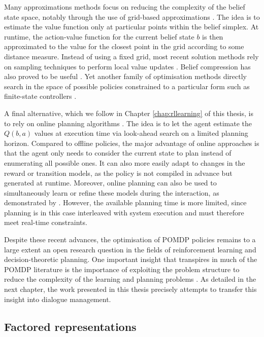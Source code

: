 Many approximations methods focus on reducing the complexity of the belief state space, notably through the use of grid-based approximations \citep{Zhou:2001}.  The idea is to estimate the value function only at particular points within the belief simplex. At runtime, the action-value function for the current belief state $b$ is then approximated to the value for the closest point in the grid according to some distance measure. Instead of using a fixed grid, most recent solution methods rely on sampling techniques to perform local value updates \citep{Pineau_2003,KurHsu08,shani2013}. Belief compression has also proved to be useful \citep{Roy:2005}.  Yet another family of optimisation methods directly search in the space of possible policies constrained to a particular form such as finite-state controllers \citep{Hansen98}. 

A final alternative, which we follow in Chapter \ref{chap:rllearning} of this thesis, is to rely on online planning algorithms \citep{ross2008,NIPS2010_0740}.  The idea is to let the agent estimate the $Q(b,a)$ values at execution time via look-ahead search on a limited planning horizon. Compared to offline policies, the major advantage of online approaches is that the agent only needs to consider the current state to plan instead of enumerating all possible ones. It can also more easily adapt to changes in the reward or transition models, as the policy is not compiled in advance but generated at runtime. Moreover, online planning can also be used to simultaneously learn or refine these models during the interaction, as demonstrated by \cite{Ross:2011}.  However, the available planning time is more limited, since planning is in this case interleaved with system execution and must therefore meet real-time constraints. %

Despite these recent advances, the optimisation of POMDP policies remains to a large extent an open research question in the fields of reinforcement learning and decision-theoretic planning. One important insight that transpires in much of the POMDP literature is the importance of exploiting the problem structure to reduce the complexity of the learning and planning problems \citep{Pineau:2004,poupart2005}.  As detailed in the next chapter, the work presented in this thesis precisely attempts to transfer this insight into dialogue management. 

\subsection{Factored representations}
\label{sec:factored}

